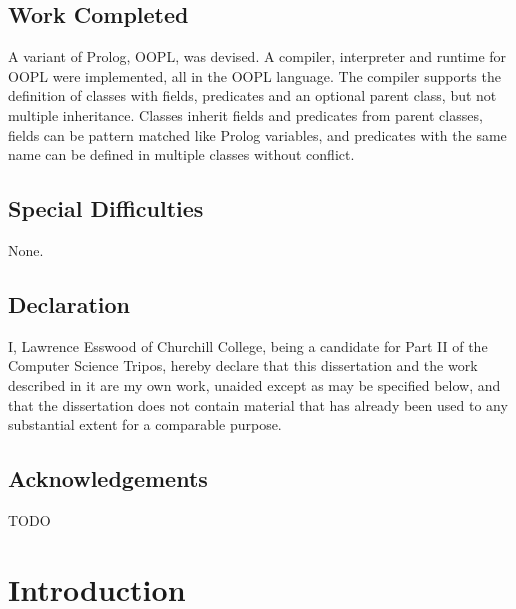 \documentclass[12pt,a4paper,twoside,openright]{report}
\begin{document}
\section*{Work Completed}

A variant of Prolog, OOPL, was devised. A compiler, interpreter and runtime for OOPL were implemented, all in the OOPL language. The compiler supports the definition of classes with fields, predicates and an optional parent class, but not multiple inheritance. Classes inherit fields and predicates from parent classes, fields can be pattern matched like Prolog variables, and predicates with the same name can be defined in multiple classes without conflict.

\section*{Special Difficulties}

None.
 
\newpage
\section*{Declaration}

I, Lawrence Esswood of Churchill College, being a candidate for Part II of the Computer
Science Tripos, hereby declare that this dissertation and the work described in it are my own work,
unaided except as may be specified below, and that the dissertation
does not contain material that has already been used to any substantial
extent for a comparable purpose.

\bigskip
{}

\medskip
{}

\tableofcontents

\listoffigures

\newpage
\section*{Acknowledgements}

TODO


\pagestyle{headings}

\chapter{Introduction}
\end{document}
